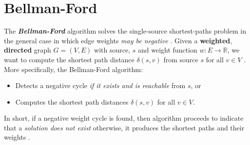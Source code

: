 \documentclass[a4paper, 12pt]{report}
\theoremstyle{definition}
\begin{document}
\section{Bellman-Ford}
The \emph{\textbf{Bellman-Ford}} algorithm solves the single-source shortest-paths problem in the general case in which edge weights \emph{may be negative} \cite{cormenBk}. Given a \textbf{weighted}, \textbf{directed} graph \(G = (V, E)\) with source, \(s\) and weight function $w: E \rightarrow \mathbb{R}$,
we want to compute the shortest path distance \(\delta(s, v)\) from source $s$ for all $v \in V$ \cite{stand:bford:11,cormenBk}. More specifically, the Bellman-Ford algorithm:
\begin{itemize}
    \item Detects a negative cycle \emph{if it exists and is reachable} from \(s\), or
    \item Computes the shortest path distances $\delta(s, v)$ for all $v \in V$.
\end{itemize}
In short, if a negative weight cycle is found, then algorithm proceeds to indicate that a \emph{solution does not exist} otherwise, it produces the shortest paths and their weights \cite{cormenBk,stand:bford:11}.
\end{document}
